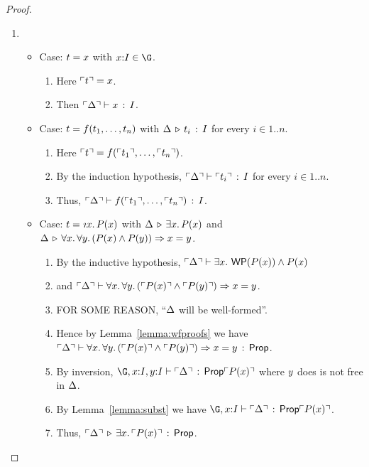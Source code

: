 \documentclass[10pt,letter]{article}
\begin{document}
\begin{proof}
\mbox{}

\begin{enumerate}
\item %
  \begin{itemize}
  \item Case: $t = x$ with $\x{:}\I\in\G$.
    \begin{enumerate}
    \item 
      Here $\ulcorner t \urcorner = x$.
    \item 
      Then $\ulcorner \Delta \urcorner \vdash x\, :\, I$.
    \end{enumerate}
  \item Case: $t = f({t}_1,\ldots,{t}_{n})$ with $\Delta \,\triangleright\, t_i\, :\, I$ for every $i\in1..n$.
    \begin{enumerate}
    \item 
      Here $\ulcorner t \urcorner = f(\ulcorner t_1 \urcorner,\ldots,\ulcorner t_n \urcorner)$.
    \item 
      By the induction hypothesis, $\ulcorner \Delta \urcorner \vdash \ulcorner t_i \urcorner\, :\, I$ for every $i\in1..n$.
    \item 
      Thus, $\ulcorner \Delta \urcorner \vdash f(\ulcorner t_1 \urcorner,\ldots,\ulcorner t_n \urcorner)\, :\, I$.
    \end{enumerate}
  \item Case: $\t = \tDesc{\x}{\I}{\p(\x)}$ with
     $\Delta \,\triangleright\, \exists x.\, P(x)$ and
     $\Delta \,\triangleright\, \forall x.\, \forall y.\, (P(x) \wedge P(y)) \Rightarrow x = y$.
     \begin{enumerate}
     \item 
       \label{lemma:l41:proofline:a2}
       By the inductive hypothesis, 
     $\ulcorner \Delta \urcorner \vdash \exists x.\, \mathop{\mathsf{WP}}(P(x)) \wedge P(x)$
     \item
       and
       $\ulcorner \Delta \urcorner \vdash \forall x.\, \forall y.\, (\ulcorner P(x) \urcorner \wedge \ulcorner P(y) \urcorner) \Rightarrow x = y$.
     \item 
       FOR SOME REASON, ``$\Delta$ will be well-formed''.
     \item 
       Hence by Lemma~\ref{lemma:wfproofs} we have
       $\ulcorner \Delta \urcorner \vdash \forall x.\, \forall y.\, (\ulcorner P(x) \urcorner \wedge \ulcorner P(y) \urcorner) \Rightarrow x = y\, :\, \mathsf{Prop}$.
     \item 
       By inversion,
       $\jwfprop{\G,\x{:}\I,\y{:}\I}{\trans{\D}}{\trans{\p(\x)}}$
       where $y$ does is not free in $\Delta$.
     \item
       By Lemma~\ref{lemma:subst} we have
       $\jwfprop{\G,\x{:}\I}{\trans{\D}}{\trans{\p(\x)}}$.
     \item
       \label{lemma:l41:proofline:a1}
       Thus, $\ulcorner \Delta \urcorner \,\triangleright\, \exists x.\, \ulcorner P(x) \urcorner\,:\, \mathsf{Prop}$.
\smallskip


\end{enumerate}
\end{itemize}
\end{enumerate}
\end{proof}
\end{document}
